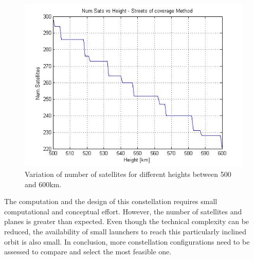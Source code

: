 \begin{figure}[H]
\begin{center}
\includegraphics[scale=0.7]{PolarOrbits/Polar.jpg}
\caption{Variation of number of satellites for different heights between 500 and 600km.}
\end{center}
\end{figure}

The computation and the design of this constellation requires small computational and conceptual effort. However, the number of satellites and planes is greater than expected. Even though the technical complexity can be reduced, the availability of small launchers to reach this particularly inclined orbit is also small. In conclusion, more constellation configurations need to be assessed to compare and select the most feasible one.

%
%